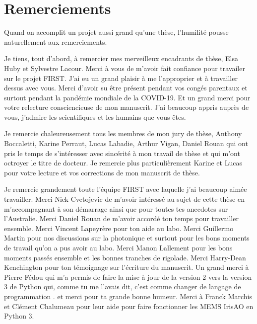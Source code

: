 \newpage
\thispagestyle{empty}
\chapter*{Remerciements}

\footnotesize Quand on accomplit un projet aussi grand qu'une thèse, l'humilité pousse naturellement aux remerciements.

Je tiens, tout d'abord, à remercier mes merveilleux encadrants de thèse, Elsa Huby et Sylvestre Lacour. Merci à vous de m'avoir fait confiance pour travailer sur le projet FIRST. J'ai eu un grand plaisir à me l'approprier et à travailler dessus avec vous. Merci d'avoir su être présent pendant vos congés parentaux et surtout pendant la pandémie mondiale de la COVID-19. Et un grand merci pour votre relecture consciencieuse de mon manuscrit. J'ai beaucoup appris auprès de vous, j'admire les scientifiques et les humains que vous êtes.

Je remercie chaleureusement tous les membres de mon jury de thèse, Anthony Boccaletti, Karine Perraut, Lucas Labadie, Arthur Vigan, Daniel Rouan qui ont pris le temps de s'intéresser avec sincérité à mon travail de thèse et qui m'ont octroyer le titre de docteur. Je remercie plus particulièrement Karine et Lucas pour votre lecture et vos corrections de mon manuscrit de thèse.

Je remercie grandement toute l'équipe FIRST avec laquelle j'ai beaucoup aimée travailler. Merci Nick Cvetojevic de m'avoir intéressé au sujet de cette thèse en m'accompagnant à son démarrage ainsi que pour toutes tes anecdotes sur l'Australie. Merci Daniel Rouan de m'avoir accordé ton temps pour travailler ensemble. Merci Vincent Lapeyrère pour ton aide au labo. Merci Guillermo Martin pour nos discussions sur la photonique et surtout pour les bons moments de travail qu'on a pus avoir au labo. Merci Manon Lallement pour les bons moments passés ensemble et les bonnes tranches de rigolade. Merci Harry-Dean Kenchington pour ton témoignage sur l'écriture du manuscrit. Un grand merci à Pierre Fédou qui m'a permis de faire la mise à jour de la version 2 vers la version 3 de Python qui, comme tu me l'avais dit, \og c'est comme changer de langage de programmation \fg. et merci pour ta grande bonne humeur. Merci à Franck Marchis et Clément Chalumeau pour leur aide pour faire fonctionner les MEMS IrisAO en Python 3.

